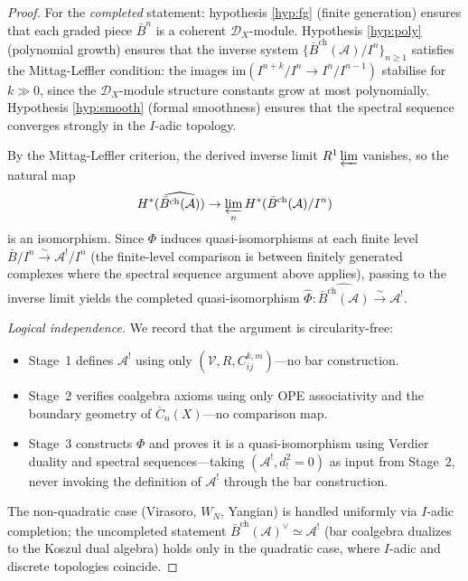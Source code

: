 \begin{proof}
For the \emph{completed} statement: hypothesis \ref{hyp:fg} (finite generation) ensures that each graded piece $\bar{B}^n$ is a coherent $\mathcal{D}_X$-module.  Hypothesis \ref{hyp:poly} (polynomial growth) ensures that the inverse system $\{\bar{B}^{\mathrm{ch}}(\mathcal{A})/I^n\}_{n \geq 1}$ satisfies the Mittag-Leffler condition: the images $\mathrm{im}(I^{n+k}/I^n \to I^n/I^{n-1})$ stabilise for $k \gg 0$, since the $\mathcal{D}_X$-module structure constants grow at most polynomially.  Hypothesis \ref{hyp:smooth} (formal smoothness) ensures that the spectral sequence converges strongly in the $I$-adic topology.

By the Mittag-Leffler criterion, the derived inverse limit $R^1\varprojlim$ vanishes, so the natural map
\[H^*(\widehat{\bar{B}^{\mathrm{ch}}(\mathcal{A})}) \to \varprojlim_n H^*(\bar{B}^{\mathrm{ch}}(\mathcal{A})/I^n)\]
is an isomorphism.  Since $\Phi$ induces quasi-isomorphisms at each finite level $\bar{B}/I^n \xrightarrow{\sim} \mathcal{A}^!/I^n$ (the finite-level comparison is between finitely generated complexes where the spectral sequence argument above applies), passing to the inverse limit yields the completed quasi-isomorphism $\widehat\Phi \colon \widehat{\bar{B}^{\mathrm{ch}}(\mathcal{A})} \xrightarrow{\sim} \mathcal{A}^!$.

\medskip
\noindent\emph{Logical independence.}  We record that the argument is circularity-free:
\begin{itemize}
\item Stage~1 defines $\mathcal{A}^!$ using only $(\mathcal{V}, R, C_{ij}^{k,m})$---no bar construction.
\item Stage~2 verifies coalgebra axioms using only OPE associativity and the boundary geometry of $\overline{C}_n(X)$---no comparison map.
\item Stage~3 constructs $\Phi$ and proves it is a quasi-isomorphism using Verdier duality and spectral sequences---taking $(\mathcal{A}^!, d_!^2=0)$ as input from Stage~2, never invoking the definition of $\mathcal{A}^!$ through the bar construction.
\end{itemize}
The non-quadratic case (Virasoro, $W_N$, Yangian) is handled uniformly via $I$-adic completion; the uncompleted statement $\bar{B}^{\mathrm{ch}}(\mathcal{A})^{\vee} \simeq \mathcal{A}^!$ (bar coalgebra dualizes to the Koszul dual algebra) holds only in the quadratic case, where $I$-adic and discrete topologies coincide.
\end{proof}

